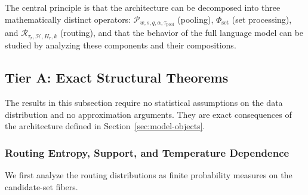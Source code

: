 \documentclass{article}
\theoremstyle{plain}
\theoremstyle{definition}
\theoremstyle{remark}
\begin{document}
The central principle is that the architecture can be decomposed into three mathematically distinct operators:
$\mathcal{P}_{w,s,q,\alpha,\tau_{\mathrm{pool}}}$ (pooling), $\Phi_{\mathrm{set}}$ (set processing), and
$\mathcal{R}_{\tau_r,\mathcal{H},H_r,k}$ (routing), and that the behavior of the full language model can be studied by analyzing these components and their compositions.

\subsection{Tier A: Exact Structural Theorems}
\label{sec:tier-a}

The results in this subsection require no statistical assumptions on the data distribution and no approximation arguments. They are exact consequences of the architecture defined in Section~\ref{sec:model-objects}.

\subsubsection{Routing Entropy, Support, and Temperature Dependence}
\label{sec:tier-a-routing-entropy}

We first analyze the routing distributions as finite probability measures on the candidate-set fibers.
\end{document}
